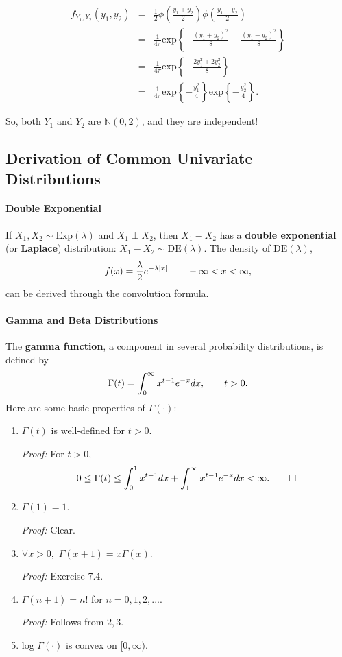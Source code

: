 \documentclass[12pt,oneside]{article}
\begin{document}
\begin{eqnarray*} f_{Y_1,Y_2}(y_1,y_2) &=& \frac{1}{2} \phi(\frac{y_1+y_2}{2}) \phi(\frac{y_1-y_2}{2}) \\
					&=& \frac{1}{4 \pi} \mbox{exp} \left \{-\frac{(y_1+y_2)^2}{8} - \frac{(y_1-y_2)^2}{8} \right \} \\
					&=&  \frac{1}{4 \pi} \mbox{exp} \left \{-\frac{2y_1^2+2y_2^2}{8} \right \} \\
					&=&  \frac{1}{4 \pi} \mbox{exp} \left \{-\frac{y_1^2}{4} \right \} \mbox{exp} \left \{-\frac{y_2^2}{4} \right \}. \end{eqnarray*}

So, both $Y_1$ and $Y_2$ are $\mathbb{N}(0,2)$, and they are independent!

\subsection{Derivation of Common Univariate Distributions}

\paragraph{Double Exponential} 
If $X_1, X_2 \sim \mbox{Exp} (\lambda)$ and $X_1 \perp X_2$, then $X_1 - X_2$ has a \textbf{double exponential} (or \textbf{Laplace}) distribution:  $X_1 - X_2 \sim \mbox{DE}(\lambda)$.  The density of $\mbox{DE}(\lambda)$,
\[f(x) = \frac{\lambda}{2} e^{-\lambda |x|} \hspace{20 pt} -\infty < x < \infty ,\]
can be derived through the convolution formula. \\

\paragraph{Gamma and Beta Distributions}
The \textbf{gamma function}, a component in several probability distributions,  is defined by \[\Gamma (t)  = \int_0^\infty x^{t-1}e^{-x} dx, \hspace{20 pt} t > 0.\]
Here are some basic properties of $\Gamma(\cdot):$
\begin{enumerate}
\item $\Gamma(t)$ is well-defined for $t>0$.

\emph{Proof:} For $t>0$, \[0 \leq \Gamma(t) \leq \int_0^1 x^{t-1} dx + \int_1^\infty x^{t-1}e^{-x}dx < \infty. \hspace{20 pt} \Box \]

\item $\Gamma (1) = 1$.

\emph{Proof:} Clear.

\item $\forall x>0,$ $\Gamma(x+1) = x \Gamma(x)$.

\emph{Proof:} Exercise 7.4.

\item $\Gamma (n+1) = n!$ for $n=0,1,2,...$.

\emph{Proof:} Follows from $2,3$.

\item log $\Gamma(\cdot)$ is convex on $[0,\infty)$.\\
\end{enumerate}
\end{document}

